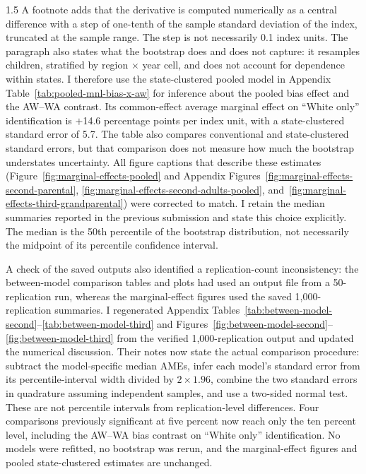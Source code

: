 \documentclass[12pt,english]{article}
\newcommand{\rrxspc}{1.5}
\begin{document}
\begin{refsection}
\begin{spacing}{\rrxspc}
        A footnote adds that the derivative is computed numerically as a central difference with a step of one-tenth of the sample standard deviation of the index, truncated at the sample range. The step is not necessarily 0.1 index units. The paragraph also states what the bootstrap does and does not capture: it resamples children, stratified by region $\times$ year cell, and does not account for dependence within states. I therefore use the state-clustered pooled model in Appendix Table~\ref{tab:pooled-mnl-bias-x-aw} for inference about the pooled bias effect and the AW--WA contrast. Its common-effect average marginal effect on ``White only'' identification is $+$14.6 percentage points per index unit, with a state-clustered standard error of 5.7. The table also compares conventional and state-clustered standard errors, but that comparison does not measure how much the bootstrap understates uncertainty. All figure captions that describe these estimates (Figure~\ref{fig:marginal-effects-pooled} and Appendix Figures~\ref{fig:marginal-effects-second-parental}, \ref{fig:marginal-effects-second-adults-pooled}, and~\ref{fig:marginal-effects-third-grandparental}) were corrected to match. I retain the median summaries reported in the previous submission and state this choice explicitly. The median is the 50th percentile of the bootstrap distribution, not necessarily the midpoint of its percentile confidence interval.

        A check of the saved outputs also identified a replication-count inconsistency: the between-model comparison tables and plots had used an output file from a 50-replication run, whereas the marginal-effect figures used the saved 1{,}000-replication summaries. I regenerated Appendix Tables~\ref{tab:between-model-second}--\ref{tab:between-model-third} and Figures~\ref{fig:between-model-second}--\ref{fig:between-model-third} from the verified 1{,}000-replication output and updated the numerical discussion. Their notes now state the actual comparison procedure: subtract the model-specific median AMEs, infer each model's standard error from its percentile-interval width divided by $2\times1.96$, combine the two standard errors in quadrature assuming independent samples, and use a two-sided normal test. These are not percentile intervals from replication-level differences. Four comparisons previously significant at five percent now reach only the ten percent level, including the AW--WA bias contrast on ``White only'' identification. No models were refitted, no bootstrap was rerun, and the marginal-effect figures and pooled state-clustered estimates are unchanged.
    \end{spacing}


\end{refsection}
\end{document}
